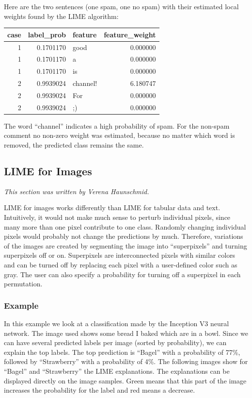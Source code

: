 \documentclass[
  12pt,
]{krantz}
\begin{document}
Here are the two sentences (one spam, one no spam) with their estimated local weights found by the LIME algorithm:

\begin{tabular}{r|r|l|r}
\hline
case & label\_prob & feature & feature\_weight\\
\hline
1 & 0.1701170 & good & 0.000000\\
\hline
1 & 0.1701170 & a & 0.000000\\
\hline
1 & 0.1701170 & is & 0.000000\\
\hline
2 & 0.9939024 & channel! & 6.180747\\
\hline
2 & 0.9939024 & For & 0.000000\\
\hline
2 & 0.9939024 & ;) & 0.000000\\
\hline
\end{tabular}

The word ``channel'' indicates a high probability of spam.
For the non-spam comment no non-zero weight was estimated, because no matter which word is removed, the predicted class remains the same.

\hypertarget{images-lime}{%
\subsection{LIME for Images}\label{images-lime}}

\emph{This section was written by Verena Haunschmid.}

LIME for images works differently than LIME for tabular data and text.
Intuitively, it would not make much sense to perturb individual pixels, since many more than one pixel contribute to one class.
Randomly changing individual pixels would probably not change the predictions by much.
Therefore, variations of the images are created by segmenting the image into ``superpixels'' and turning superpixels off or on.
Superpixels are interconnected pixels with similar colors and can be turned off by replacing each pixel with a user-defined color such as gray.
The user can also specify a probability for turning off a superpixel in each permutation.

\hypertarget{example-7}{%
\subsubsection{Example}\label{example-7}}

In this example we look at a classification made by the Inception V3 neural network.
The image used shows some bread I baked which are in a bowl.
Since we can have several predicted labels per image (sorted by probability), we can explain the top labels.
The top prediction is ``Bagel'' with a probability of 77\%, followed by ``Strawberry'' with a probability of 4\%.
The following images show for ``Bagel'' and ``Strawberry'' the LIME explanations.
The explanations can be displayed directly on the image samples.
Green means that this part of the image increases the probability for the label and red means a decrease.
\end{document}
